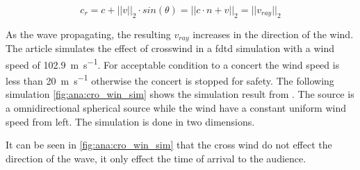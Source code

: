 \begin{equation}\label{eq:ana:wind_angle}
c_r = c+||v||_2 \cdot sin(\theta) = ||c \cdot n + v||_2 = ||v_{ray}||_2
\end{equation}

\startexplain
{}
\stopexplain



As the wave propagating, the resulting $v_{ray}$ increases in the direction of the wind. The article \citep{crosswind_simulation} simulates the effect of crosswind in a \gls{fdtd} simulation with a wind speed of \SI{102.9}{\meter\per\second}. For acceptable condition to a concert the wind speed is less than \SI{20}{\meter\per\second} otherwise the concert is stopped for safety. The following simulation \autoref{fig:ana:cro_win_sim} shows the simulation result from \citep{crosswind_simulation}. The source is a omnidirectional  spherical source while the wind have a constant uniform wind speed from left. The simulation is done in two dimensions. 



It can be seen in \autoref{fig:ana:cro_win_sim} that the cross wind do not effect the direction of the wave, it only effect the time of arrival to the audience.






